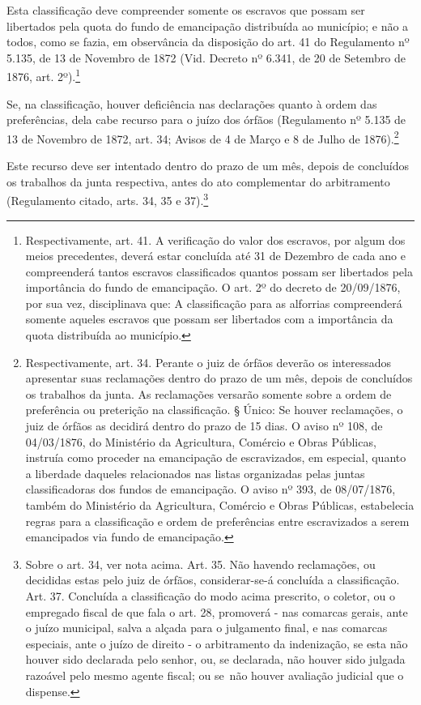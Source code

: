 Esta classificação deve compreender somente os escravos que possam ser
libertados pela quota do fundo de emancipação distribuída ao município;
e não a todos, como se fazia, em observância da disposição do art. 41 do
Regulamento nº 5.135, de 13 de Novembro de 1872 (Vid. Decreto nº 6.341,
de 20 de Setembro de 1876, art. 2º).\footnote{Respectivamente, art.
  41. A verificação do valor dos escravos, por algum dos meios
  precedentes, deverá estar concluída até 31 de Dezembro de cada ano e
  compreenderá tantos escravos classificados quantos possam ser
  libertados pela importância do fundo de emancipação. O art. 2º do
  decreto de 20/09/1876, por sua vez, disciplinava que: A classificação
  para as alforrias compreenderá somente aqueles escravos que possam ser
  libertados com a importância da quota distribuída ao município.}

Se, na classificação, houver deficiência nas declarações quanto à ordem
das preferências, dela cabe recurso para o juízo dos órfãos (Regulamento
nº 5.135 de 13 de Novembro de 1872, art. 34; Avisos de 4 de Março e 8 de
Julho de 1876).\footnote{Respectivamente, art. 34. Perante o juiz de
  órfãos deverão os interessados apresentar suas reclamações dentro do
  prazo de um mês, depois de concluídos os trabalhos da junta. As
  reclamações versarão somente sobre a ordem de preferência ou
  preterição na classificação. § Único: Se houver reclamações, o juiz de
  órfãos as decidirá dentro do prazo de 15 dias. O aviso nº 108, de
  04/03/1876, do Ministério da Agricultura, Comércio e Obras Públicas,
  instruía como proceder na emancipação de escravizados, em especial,
  quanto a liberdade daqueles relacionados nas listas organizadas pelas
  juntas classificadoras dos fundos de emancipação. O aviso nº 393, de
  08/07/1876, também do Ministério da Agricultura, Comércio e Obras
  Públicas, estabelecia regras para a classificação e ordem de
  preferências entre escravizados a serem emancipados via fundo de
  emancipação.}

Este recurso deve ser intentado dentro do prazo de um mês, depois de
concluídos os trabalhos da junta respectiva, antes do ato complementar
do arbitramento (Regulamento citado, arts. 34, 35 e 37).\footnote{
  Sobre o art. 34, ver nota acima. Art. 35. Não havendo reclamações, ou
  decididas estas pelo juiz de órfãos, considerar-se-á concluída a
  classificação. Art. 37. Concluída a classificação do modo acima
  prescrito, o coletor, ou o empregado fiscal de que fala o art. 28,
  promoverá - nas comarcas gerais, ante o juízo municipal, salva a
  alçada para o julgamento final, e nas comarcas especiais, ante o juízo
  de direito - o arbitramento da indenização, se esta não houver sido
  declarada pelo senhor, ou, se declarada, não houver sido julgada
  razoável pelo mesmo agente fiscal; ou se~não houver avaliação judicial
  que o dispense.}

